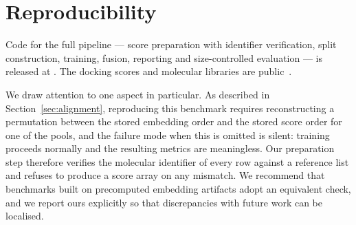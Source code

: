 \section{Reproducibility}
\label{sec:repro}

Code for the full pipeline --- score preparation with identifier verification,
split construction, training, fusion, reporting and size-controlled evaluation
--- is released at . The docking scores and molecular
libraries are public~\citep{lyu2019ultralarge,graff2021molpal}.

We draw attention to one aspect in particular. As described in
Section~\ref{sec:alignment}, reproducing this benchmark requires reconstructing
a permutation between the stored embedding order and the stored score order for
one of the pools, and the failure mode when this is omitted is silent: training
proceeds normally and the resulting metrics are meaningless. Our preparation
step therefore verifies the molecular identifier of every row against a
reference list and refuses to produce a score array on any mismatch. We
recommend that benchmarks built on precomputed embedding artifacts adopt an
equivalent check, and we report ours explicitly so that discrepancies with
future work can be localised.

